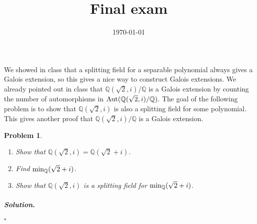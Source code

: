 \documentclass[reqno]{amsart}
\theoremstyle{plain}
\newtheorem{problem}{Problem}
\theoremstyle{definition}
\newenvironment{solution}{\paragraph{\emph{Solution}.}}{\hfill$\square$}
\begin{document}
 

\title[Final exam]{Final exam}

\date{\today} 
\maketitle 

We showed in class that a splitting field for a separable polynomial always gives a Galois extension, so this gives a nice way to construct Galois extensions.  We already pointed out in class that $\mathbb{Q}(\sqrt{2},i)/\mathbb{Q}$ is a Galois extension by counting the number of automorphisms in ${\rm Aut}(\mathbb{Q}(\sqrt{2},i)/\mathbb{Q})$.  The goal of the following problem is to show that $\mathbb{Q}(\sqrt{2},i)$ is also a splitting field for some polynomial.  This gives another proof that $\mathbb{Q}(\sqrt{2},i)/\mathbb{Q}$ is a Galois extension.
\begin{problem}
\hspace{1cm}
\begin{enumerate}
\item Show that $\mathbb{Q}(\sqrt{2},i) = \mathbb{Q}(\sqrt{2} + i)$.
\item Find ${\rm min}_{\mathbb{Q}}(\sqrt{2} + i)$.
\item Show that $\mathbb{Q}(\sqrt{2},i)$ is a splitting field for ${\rm min}_{\mathbb{Q}}(\sqrt{2}+i)$.
\end{enumerate}
\end{problem}
\begin{solution}

\end{solution}
\end{document}
